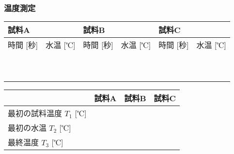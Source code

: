  \newpage


\subsubsection*{温度測定}



\hspace*{-\parindent}
\begin{tabular}{|c|c||c|c||c|c|}
\hline
\multicolumn{2}{|l||}{試料A} & \multicolumn{2}{|l||}{試料B} & \multicolumn{2}{|l|}{試料C} \\
\hline
時間 [秒] & 水温 [℃] & 時間 [秒] & 水温  [℃] & 時間 [秒] & 水温  [℃] \\
\hline
\hspace*{2cm}&\hspace*{2cm}&\hspace*{2cm}&\hspace*{2cm}&\hspace*{2cm}&\hspace*{2cm}\\
\hline
&&&&&\\
\hline
&&&&&\\
\hline
&&&&&\\
\hline
&&&&&\\
\hline
&&&&&\\
\hline
&&&&&\\
\hline
&&&&&\\
\hline
&&&&&\\
\hline
&&&&&\\
\hline
\end{tabular}



\bigskip

\hspace*{-\parindent}
\begin{tabular}{|l|p{3.5cm}|p{3.5cm}|p{3.5cm}|}
\hline
 & 試料A & 試料B & 試料C \\
\hline
最初の試料温度 $T_1$ [℃] & & & \\
\hline
最初の水温 $T_2$ [℃] & & & \\
\hline
最終温度 $T_3$ [℃] & & & \\
\hline
\end{tabular}


